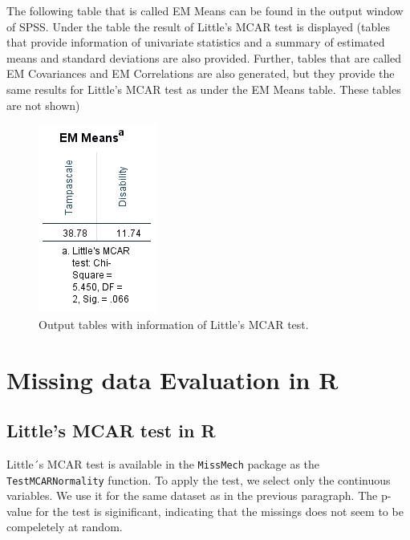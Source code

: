 \documentclass[
]{book}
\begin{document}
The following table that is called EM Means can be found in the output window of SPSS. Under the table the result of Little's MCAR test is displayed (tables that provide information of univariate statistics and a summary of estimated means and standard deviations are also provided. Further, tables that are called EM Covariances and EM Correlations are also generated, but they provide the same results for Little's MCAR test as under the EM Means table. These tables are not shown)

\begin{figure}

{\centering \includegraphics[width=0.4\linewidth]{images/fig2.14} 

}

\caption{Output tables with information of Little’s MCAR test.}\label{fig:tab2-7}
\end{figure}

\hypertarget{missing-data-evaluation-in-r}{%
\section{Missing data Evaluation in R}\label{missing-data-evaluation-in-r}}

\hypertarget{littles-mcar-test-in-r}{%
\subsection{Little's MCAR test in R}\label{littles-mcar-test-in-r}}

Little´s MCAR test is available in the \texttt{MissMech} package as the \texttt{TestMCARNormality} function. To apply the test, we select only the continuous variables. We use it for the same dataset as in the previous paragraph. The p-value for the test is siginificant, indicating that the missings does not seem to be compeletely at random.
\end{document}
